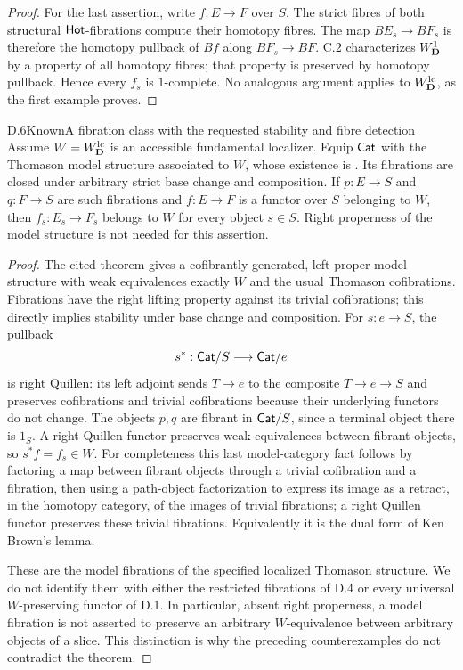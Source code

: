 \begin{proof}
For the last assertion, write $f:E\to F$ over $S$. The strict fibres of both structural $\mathsf{Hot}$-fibrations compute their homotopy fibres. The map $BE_s\to BF_s$ is therefore the homotopy pullback of $Bf$ along $BF_s\to BF$. C.2 characterizes $W^1_{\mathbf D}$ by a property of all homotopy fibres; that property is preserved by homotopy pullback. Hence every $f_s$ is $1$-complete. No analogous argument applies to $W^{\mathrm{lc}}_{\mathbf D}$, as the first example proves.
\end{proof}

\begin{claim}{D.6}{Known}{A fibration class with the requested stability and fibre detection}
Assume $W=W^{\mathrm{lc}}_{\mathbf D}$ is an accessible fundamental localizer. Equip $\mathsf{Cat}$ with the Thomason model structure associated to $W$, whose existence is \citet[Theorem 5.2.15]{Cisinski2006}. Its fibrations are closed under arbitrary strict base change and composition. If $p:E\to S$ and $q:F\to S$ are such fibrations and $f:E\to F$ is a functor over $S$ belonging to $W$, then $f_s:E_s\to F_s$ belongs to $W$ for every object $s\in S$. Right properness of the model structure is not needed for this assertion.
\end{claim}
\begin{proof}
The cited theorem gives a cofibrantly generated, left proper model structure with weak equivalences exactly $W$ and the usual Thomason cofibrations. Fibrations have the right lifting property against its trivial cofibrations; this directly implies stability under base change and composition. For $s:e\to S$, the pullback
\[
 s^*:\mathsf{Cat}/S\longrightarrow\mathsf{Cat}/e
\]
is right Quillen: its left adjoint sends $T\to e$ to the composite $T\to e\to S$ and preserves cofibrations and trivial cofibrations because their underlying functors do not change. The objects $p,q$ are fibrant in $\mathsf{Cat}/S$, since a terminal object there is $1_S$. A right Quillen functor preserves weak equivalences between fibrant objects, so $s^*f=f_s\in W$. For completeness this last model-category fact follows by factoring a map between fibrant objects through a trivial cofibration and a fibration, then using a path-object factorization to express its image as a retract, in the homotopy category, of the images of trivial fibrations; a right Quillen functor preserves these trivial fibrations. Equivalently it is the dual form of Ken Brown's lemma.

These are the model fibrations of the specified localized Thomason structure. We do not identify them with either the restricted fibrations of D.4 or every universal $W$-preserving functor of D.1. In particular, absent right properness, a model fibration is not asserted to preserve an arbitrary $W$-equivalence between arbitrary objects of a slice. This distinction is why the preceding counterexamples do not contradict the theorem.
\end{proof}

